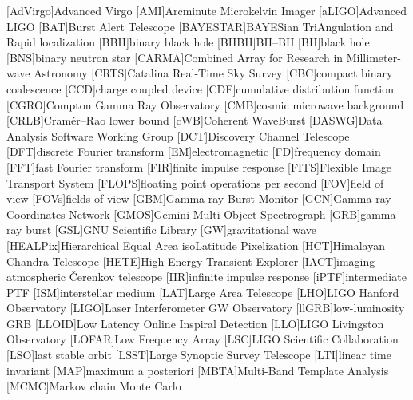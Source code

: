 \begin{acronym}
[AdVirgo]{Advanced Virgo}
[AMI]{Arcminute Microkelvin Imager}
[aLIGO]{Advanced \acs{LIGO}}
[BAT]{Burst Alert Telescope}
[BAYESTAR]{BAYESian TriAngulation and Rapid localization}
[BBH]{binary black hole}
[BHBH]{\acl{BH}\nobreakdashes--\acl{BH}}
[BH]{black hole}
[BNS]{binary neutron star}
[CARMA]{Combined Array for Research in Millimeter\nobreakdashes-wave Astronomy}
[CRTS]{Catalina Real-Time Sky Survey}
[CBC]{compact binary coalescence}
[CCD]{charge coupled device}
[CDF]{cumulative distribution function}
[CGRO]{Compton Gamma Ray Observatory}
[CMB]{cosmic microwave background}
[CRLB]{Cram\'{e}r\nobreakdashes--Rao lower bound}
[cWB]{Coherent WaveBurst}
[DASWG]{Data Analysis Software Working Group}
[DCT]{Discovery Channel Telescope}
[DFT]{discrete Fourier transform}
[EM]{electromagnetic}
[FD]{frequency domain}
[FFT]{fast Fourier transform}
[FIR]{finite impulse response}
[FITS]{Flexible Image Transport System}
[FLOPS]{floating point operations per second}
[FOV]{field of view}
[FOVs]{fields of view}
[GBM]{Gamma-ray Burst Monitor}
[GCN]{Gamma-ray Coordinates Network}
[GMOS]{Gemini Multi-Object Spectrograph}
[GRB]{gamma-ray burst}
[GSL]{GNU Scientific Library}
[GW]{gravitational wave}
[HEALPix]{Hierarchical Equal Area isoLatitude Pixelization}
[HCT]{Himalayan Chandra Telescope}
[HETE]{High Energy Transient Explorer}
[IACT]{imaging atmospheric \v{C}erenkov telescope}
[IIR]{infinite impulse response}
[iPTF]{intermediate \acl{PTF}}
[ISM]{interstellar medium}
[LAT]{Large Area Telescope}
[LHO]{\ac{LIGO} Hanford Observatory}
[LIGO]{Laser Interferometer \acs{GW} Observatory}
[llGRB]{low\nobreakdashes-luminosity \ac{GRB}}
[LLOID]{Low Latency Online Inspiral Detection}
[LLO]{\ac{LIGO} Livingston Observatory}
[LOFAR]{Low Frequency Array}
[LSC]{\ac{LIGO} Scientific Collaboration}
[LSO]{last stable orbit}
[LSST]{Large Synoptic Survey Telescope}
[LTI]{linear time invariant}
[MAP]{maximum a posteriori}
[MBTA]{Multi-Band Template Analysis}
[MCMC]{Markov chain Monte Carlo}

\end{acronym}

